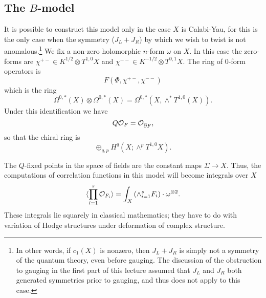 \subsection{The $B$-model}
It is possible to construct this model only  in the case $X$ is
Calabi-Yau, for 
this is the only case when the symmetry ($J_L+J_R$) by which we wish  to
twist  is not anomalous.\footnote{In other words, if $c_1(X)$ is nonzero,
then $J_L+J_R$ is simply not a symmetry of the quantum theory, even
before gauging.  The discussion of the obstruction to gauging in the
first part of this lecture assumed that $J_L$ and $J_R$ both generated
symmetries prior to gauging, and thus does not apply to this case.}
We fix a non-zero holomorphic $n$-form $\omega$ on $X$.
In this case the zero-forms are
$\chi^{+-}\in K^{1/2}\otimes T^{1,0}X$ and $\chi^{--}\in
K^{-1/2}\otimes T^{0,1}X$. The ring of $0$-form operators is
$$F(\Phi,\chi^{+-},\chi^{--})$$
which is the ring 
$$\Omega^{0,*}(X)\otimes
\Omega^{0,*}(X)=\Omega^{0,*}\left(X,\wedge^*T^{1,0}(X)\right).$$
Under this identification we have
$$Q{\cal O}_F={\cal O}_{\overline\partial F},$$
so that the chiral ring is
$$\oplus_{q,p}H^q(X;\wedge^pT^{1,0}X).$$

The $Q$-fixed points in the space of fields are the constant maps
$\Sigma\to X$. Thus, the computations of correlation functions 
in this model will become integrals over $X$ 
$$\langle \prod_{i=1}^s{\cal
O}_{F_i}\rangle=\int_X\left(\wedge_{i=1}^sF_i\right)\cdot
\omega^{\otimes 2}.$$ 
These integrals lie squarely in classical mathematics; they have to do
with variation of Hodge structures under deformation of complex
structure.  








